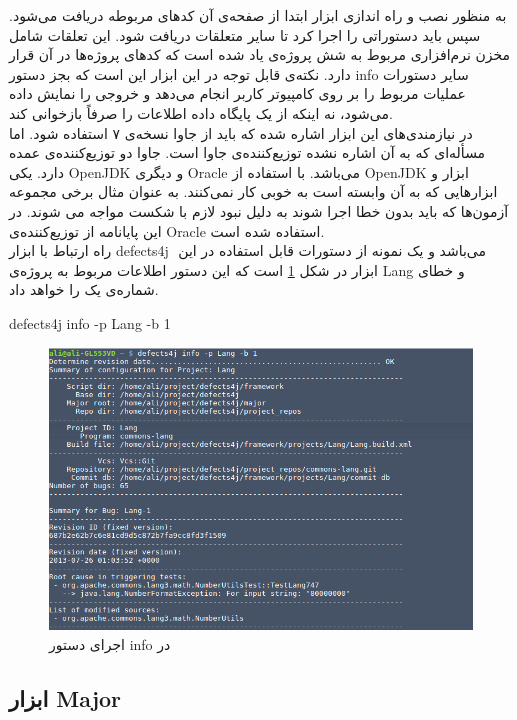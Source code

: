 به منظور نصب و راه اندازی ابزار   ابتدا از صفحه‌ی  آن  کدهای مربوطه دریافت می‌شود. سپس باید  دستوراتی را اجرا کرد تا سایر متعلقات دریافت شود. این تعلقات شامل مخزن نرم‌افزاری مربوط به شش پروژه‌ی یاد شده است که کدهای پروژه‌ها در آن قرار دارد. نکته‌ی قابل توجه در این ابزار این است  که بجز  دستور info سایر دستورات عملیات مربوط را بر روی کامپیوتر کاربر انجام می‌دهد و خروجی را نمایش  داده می‌شود، نه اینکه از یک پایگاه داده اطلاعات را صرفاً بازخوانی کند. \\
در نیازمندی‌های این ابزار اشاره شده که باید از جاوا نسخه‌ی ۷ استفاده شود. اما مسأله‌ای که به آن اشاره نشده توزیع‌کننده‌ی جاوا است. جاوا دو توزیع‌کننده‌ی عمده دارد. یکی OpenJDK و دیگری Oracle می‌باشد. با استفاده از OpenJDK ابزار  و ابزارهایی که به آن وابسته است به خوبی کار نمی‌کنند. به عنوان مثال برخی مجموعه آزمون‌ها که باید بدون خطا اجرا شوند به دلیل نبود   لازم با شکست مواجه می شوند. در این پایانامه از توزیع‌کننده‌ی Oracle استفاده شده است.\\ 
راه ارتباط با  ابزار defects4j ‌ می‌باشد و  یک نمونه‌  از دستورات قابل استفاده در این ابزار  در شکل  \ref{fig:d4j-info-command} است که این دستور اطلاعات مربوط به پروژه‌ی Lang و خطای شماره‌ی یک را خواهد داد. 
\begin{latin}
	\flushleft
defects4j info -p Lang -b 1
\end{latin}

\begin{figure}[H]
	\centering
	\includegraphics[width=.8\textwidth]{img/case_study/d4j-info-commadn.png}
	\caption{اجرای دستور info در }
	\label{fig:d4j-info-command}
\end{figure}

\subsection{ابزار Major}
\label{sec:tools-major}

